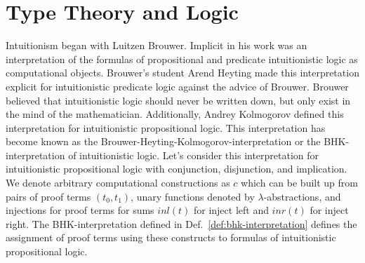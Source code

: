 \section{Type Theory and Logic}
\label{sec:type_theory_logic}
Intuitionism began with Luitzen Brouwer.  Implicit in his work was an
interpretation of the formulas of propositional and predicate
intuitionistic logic as computational objects.  Brouwer's student
Arend Heyting made this interpretation explicit for intuitionistic
predicate logic against the advice of Brouwer.  Brouwer believed that
intuitionistic logic should never be written down, but only exist in
the mind of the mathematician.  Additionally, Andrey Kolmogorov
defined this interpretation for intuitionistic propositional logic.
This interpretation has become known as the
Brouwer-Heyting-Kolmogorov-interpretation or the BHK-interpretation of
intuitionistic logic.  Let's consider this interpretation for
intuitionistic propositional logic with conjunction, disjunction, and
implication.  We denote arbitrary computational constructions as $c$
which can be built up from pairs of proof terms $(t_0,t_1)$, unary
functions denoted by $\lambda$-abstractions, and injections for proof
terms for sums $inl(t)$ for inject left and $inr(t)$ for inject right.
The BHK-interpretation defined in Def.~\ref{def:bhk-interpretation}
defines the assignment of proof terms using these constructs to
formulas of intuitionistic propositional logic.

